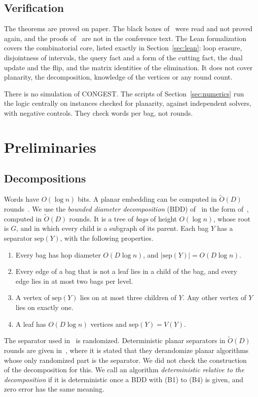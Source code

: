 \documentclass[11pt]{article}
\theoremstyle{definition}
\theoremstyle{remark}
\theoremstyle{plain}
\newcommand{\Ot}{\tilde O}
\newcommand{\sep}{\mathrm{sep}}
\begin{document}
\subsection{Verification}

The theorems are proved on paper. The black boxes of~\cite{LP19,P20,IKNS22} were read and not proved
again, and the proofs of~\cite[Lemmas 10 to 13]{P20} are not in the conference text. The Lean
formalization covers the combinatorial core, listed exactly in Section~\ref{sec:lean}: loop erasure, disjointness of intervals,
the
query fact and a form of the cutting fact, the dual update and the flip, and the matrix identities of the elimination. It does not cover planarity,
the decomposition, knowledge of the vertices or any round count.

There is no simulation of CONGEST. The scripts of Section~\ref{sec:numerics} run the logic centrally
on instances checked for planarity, against independent solvers, with negative controls. They check
words per bag, not rounds. 

\section{Preliminaries}\label{sec:prelim}

\subsection{Decompositions}\label{sec:bdd}

Words have $O(\log n)$ bits. A planar embedding can be computed in $\Ot(D)$ rounds~\cite{GH16}. We use
the \emph{bounded diameter decomposition} (BDD) of~\cite{LP19} in the form of~\cite{P20}, computed
in $\Ot(D)$ rounds. It is a tree of \emph{bags} of height $O(\log n)$, whose root is $G$, and in which
every child is a subgraph of its parent. Each bag $Y$ has a separator $\sep(Y)$, with the following
properties.
\begin{enumerate}[(B1)]
\item Every bag has hop diameter $O(D\log n)$, and $|\sep(Y)|=O(D\log n)$.
\item Every edge of a bag that is not a leaf lies in a child of the bag, and every edge lies in at most two bags per level.
\item A vertex of $\sep(Y)$ lies on at most three children of $Y$. Any other vertex of $Y$ lies on exactly one.
\item A leaf has $O(D\log n)$ vertices and $\sep(Y)=V(Y)$.
\end{enumerate}
The separator used in~\cite{LP19} is randomized. Deterministic planar separators in $\Ot(D)$ rounds are given
in~\cite{JMR25,ADW26a}, where it is stated that they derandomize planar algorithms whose only randomized part is the separator. We
did not check the construction of the decomposition for this. We call an algorithm \emph{deterministic relative to the
decomposition} if it is deterministic once a BDD with (B1) to (B4) is given, and zero error has the same meaning.
\end{document}
